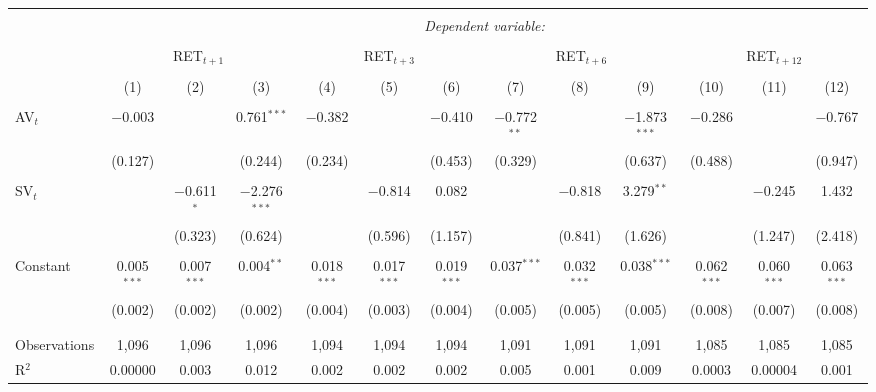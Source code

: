 
\begin{table}[!htbp] \centering 
  \caption{} 
  \label{} 
\begin{tabular}{@{\extracolsep{5pt}}lcccccccccccc} 
\\[-1.8ex]\hline 
\hline \\[-1.8ex] 
 & \multicolumn{12}{c}{\textit{Dependent variable:}} \\ 
\cline{2-13} 
\\[-1.8ex] & \multicolumn{3}{c}{RET$_{t+1}$} & \multicolumn{3}{c}{RET$_{t+3}$} & \multicolumn{3}{c}{RET$_{t+6}$} & \multicolumn{3}{c}{RET$_{t+12}$} \\ 
\\[-1.8ex] & (1) & (2) & (3) & (4) & (5) & (6) & (7) & (8) & (9) & (10) & (11) & (12)\\ 
\hline \\[-1.8ex] 
 AV$_{t}$ & $-$0.003 &  & 0.761$^{***}$ & $-$0.382 &  & $-$0.410 & $-$0.772$^{**}$ &  & $-$1.873$^{***}$ & $-$0.286 &  & $-$0.767 \\ 
  & (0.127) &  & (0.244) & (0.234) &  & (0.453) & (0.329) &  & (0.637) & (0.488) &  & (0.947) \\ 
  & & & & & & & & & & & & \\ 
 SV$_{t}$ &  & $-$0.611$^{*}$ & $-$2.276$^{***}$ &  & $-$0.814 & 0.082 &  & $-$0.818 & 3.279$^{**}$ &  & $-$0.245 & 1.432 \\ 
  &  & (0.323) & (0.624) &  & (0.596) & (1.157) &  & (0.841) & (1.626) &  & (1.247) & (2.418) \\ 
  & & & & & & & & & & & & \\ 
 Constant & 0.005$^{***}$ & 0.007$^{***}$ & 0.004$^{**}$ & 0.018$^{***}$ & 0.017$^{***}$ & 0.019$^{***}$ & 0.037$^{***}$ & 0.032$^{***}$ & 0.038$^{***}$ & 0.062$^{***}$ & 0.060$^{***}$ & 0.063$^{***}$ \\ 
  & (0.002) & (0.002) & (0.002) & (0.004) & (0.003) & (0.004) & (0.005) & (0.005) & (0.005) & (0.008) & (0.007) & (0.008) \\ 
  & & & & & & & & & & & & \\ 
\hline \\[-1.8ex] 
Observations & 1,096 & 1,096 & 1,096 & 1,094 & 1,094 & 1,094 & 1,091 & 1,091 & 1,091 & 1,085 & 1,085 & 1,085 \\ 
R$^{2}$ & 0.00000 & 0.003 & 0.012 & 0.002 & 0.002 & 0.002 & 0.005 & 0.001 & 0.009 & 0.0003 & 0.00004 & 0.001 \\ 

\end{tabular}
\end{table}
